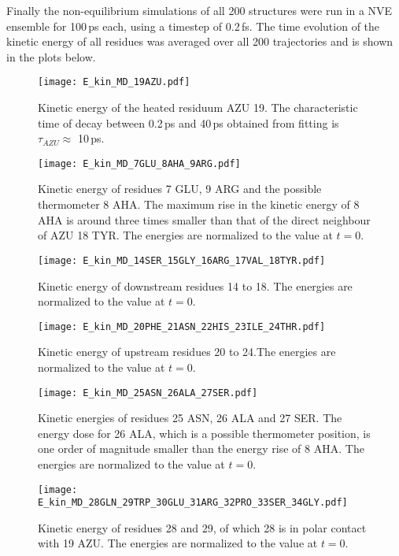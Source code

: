 \documentclass[11pt, a4paper]{report}
\begin{document}
Finally the non-equilibrium simulations of all 200 structures were run in a NVE ensemble for 100\,ps
each, using a timestep of 0.2\,fs. The time evolution of the kinetic energy of
all residues was averaged over all 200 trajectories and is shown in the plots
below.  

\begin{figure}[h]
  \centering
  \texttt{[image: E\_kin\_MD\_19AZU.pdf]}
  \caption{Kinetic energy of the heated residuum AZU 19. The characteristic time
    of decay between 0.2\,ps and 40\,ps obtained from fitting is $\tau_{AZU}
  \approx$ 10\,ps.}
  \label{fig:E_kin_MD_19}
\end{figure}

\begin{figure}[h]
  \centering
  \texttt{[image: E\_kin\_MD\_7GLU\_8AHA\_9ARG.pdf]}
  \caption{Kinetic energy of residues 7 GLU, 9 ARG and the possible thermometer
  8 AHA. The maximum rise in the kinetic energy of 8 AHA is around three times smaller
than that of the direct neighbour of AZU 18 TYR. The energies are normalized to the value at $t=0$. }
  \label{fig:E_kin_MEQ_9ARG_10MET_11SER_12ARG}
\end{figure}

\begin{figure}[h]
  \centering
  \texttt{[image: E\_kin\_MD\_14SER\_15GLY\_16ARG\_17VAL\_18TYR.pdf]}
  \caption{Kinetic energy of downstream residues 14 to 18. The energies are
  normalized to the value at $t=0$.}
  \label{fig:E_kin_MD_15_16_17_18}
\end{figure}

\begin{figure}[h]
  \centering
  \texttt{[image: E\_kin\_MD\_20PHE\_21ASN\_22HIS\_23ILE\_24THR.pdf]}
  \caption{Kinetic energy of upstream residues 20 to 24.The energies are normalized to the value at $t=0$.}
  \label{fig:E_kin_MD_20_21_22_23}
\end{figure}

\begin{figure}[h]
  \centering
  \texttt{[image: E\_kin\_MD\_25ASN\_26ALA\_27SER.pdf]}
  \caption{Kinetic energies of residues 25 ASN, 26 ALA and 27 SER. The energy
  dose for 26 ALA, which is a possible thermometer position, is one order of
magnitude smaller than the energy rise of 8 AHA. The energies are normalized to
the value at $t=0$.}
  \label{fig:name}
\end{figure}

\begin{figure}[h]
  \centering
  \texttt{[image: E\_kin\_MD\_28GLN\_29TRP\_30GLU\_31ARG\_32PRO\_33SER\_34GLY.pdf]}
  \caption{Kinetic energy of residues 28 and 29, of which 28 is in polar contact
  with 19 AZU. The energies are normalized to the value at $t=0$.}
  \label{fig:E_kin_MD_28GLN_29TRP_30GLU_31ARG_32PRO_33SER_34GLY}
\end{figure}

\clearpage

{}

\end{document}
